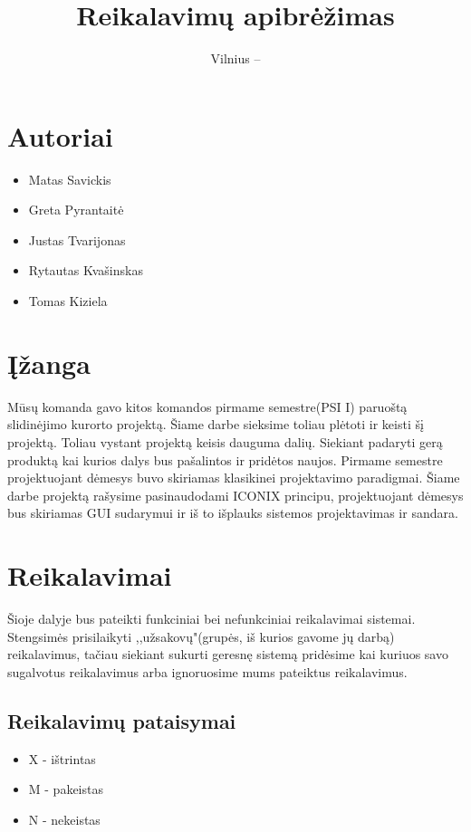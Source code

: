 \documentclass[oneside]{VUMIFPSkursinis}
\title{Reikalavimų apibrėžimas}
\date{Vilnius – \the\year}
\begin{document}
\maketitle
\tableofcontents

\section{Autoriai}
	\begin{itemize}
		\item Matas Savickis
		\item Greta Pyrantaitė
		\item Justas Tvarijonas
		\item Rytautas Kvašinskas
		\item Tomas Kiziela
	\end{itemize}
\section{Įžanga}
Mūsų komanda gavo kitos komandos pirmame semestre(PSI I) paruoštą slidinėjimo kurorto projektą. Šiame darbe sieksime toliau plėtoti ir keisti šį projektą. Toliau vystant projektą keisis dauguma dalių. Siekiant padaryti gerą produktą kai kurios  dalys bus pašalintos ir pridėtos naujos. Pirmame semestre projektuojant dėmesys buvo skiriamas klasikinei projektavimo paradigmai. Šiame darbe projektą rašysime pasinaudodami ICONIX principu, projektuojant dėmesys bus skiriamas GUI sudarymui ir iš to išplauks sistemos projektavimas ir sandara. 

\section{Reikalavimai}
Šioje dalyje bus pateikti funkciniai bei nefunkciniai reikalavimai sistemai. Stengsimės prisilaikyti ,,užsakovų"(grupės, iš kurios gavome jų darbą) reikalavimus, tačiau siekiant sukurti geresnę sistemą pridėsime kai kuriuos savo sugalvotus reikalavimus arba ignoruosime mums pateiktus reikalavimus. 

\subsection{Reikalavimų pataisymai}
	\begin{itemize}
		\item{X - ištrintas}
		\item{M - pakeistas}
		\item{N - nekeistas}
	\end{itemize}
\end{document}
